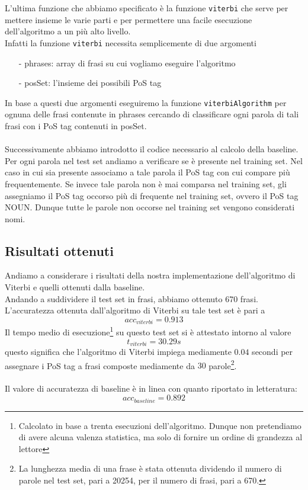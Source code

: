 \documentclass[10pt]{article}
\begin{document}
\noindent L'ultima funzione che abbiamo specificato è la funzione \texttt{viterbi} che serve per mettere insieme le varie parti e per permettere una facile esecuzione dell'algoritmo a un più alto livello.\\
Infatti la funzione \texttt{viterbi} necessita semplicemente di due argomenti
\begin{itemize}
	\item[-] phrases: array di frasi su cui vogliamo eseguire l'algoritmo
	\item[-] posSet: l'insieme dei possibili PoS tag
\end{itemize}
In base a questi due argomenti eseguiremo la funzione \texttt{viterbiAlgorithm} per ognuna delle frasi contenute in phrases cercando di classificare ogni parola di tali frasi con i PoS tag contenuti in posSet.\\
\\
Successivamente abbiamo introdotto il codice necessario al calcolo della baseline. Per ogni parola nel test set andiamo a verificare se è presente nel training set. Nel caso in cui sia presente associamo a tale parola il PoS tag con cui compare più frequentemente. Se invece tale parola non è mai comparsa nel training set, gli assegniamo  il PoS tag occorso più di frequente nel training set, ovvero il PoS tag NOUN. Dunque tutte le parole non occorse nel training set vengono considerati nomi.

\subsection{Risultati ottenuti}
Andiamo a considerare i risultati della nostra implementazione dell'algoritmo di Viterbi e quelli ottenuti dalla baseline.\\
Andando a suddividere il test set in frasi, abbiamo ottenuto 670 frasi.\\
L'accuratezza ottenuta dall'algoritmo di Viterbi su tale test set è pari a 
\begin{equation}
	acc_{viterbi}= 0.913
\end{equation}
Il tempo medio di esecuzione\footnote{Calcolato in base a trenta esecuzioni dell'algoritmo. Dunque non pretendiamo di avere alcuna valenza statistica, ma solo di fornire un ordine di grandezza al lettore} su questo test set si è attestato intorno al valore
\begin{equation}
	t_{viterbi}= 30.29 s
\end{equation}
questo significa che l'algoritmo di Viterbi impiega mediamente $0.04$ secondi per assegnare i PoS tag a frasi composte mediamente da $30$ parole\footnote{La lunghezza media di una frase è stata ottenuta dividendo il numero di parole nel test set, pari a 20254, per il numero di frasi, pari a 670.}.\\
\\
Il valore di accuratezza di baseline è in linea con quanto riportato in letteratura:
\begin{equation}
	acc_{baseline} = 0.892
\end{equation}
\end{document}
